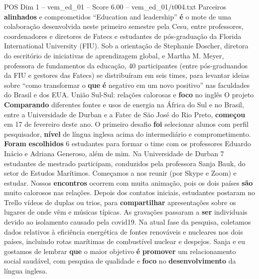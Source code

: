 \begin{textsample}{POS Dim 1 – vem\_ed\_01 – Score 6.00 – vem\_ed\_01/t004.txt}  \label{ex:f1_pos_095}
Parceiros \textbf{alinhados} e comprometidos “Education and leadership” \textbf{é} o mote de uma colaboração desenvolvida neste primeiro semestre pela Cesu, entre professores, coordenadores e diretores de Fatecs e estudantes de pós-graduação da Florida International University (FIU).
Sob a orientação de Stephanie Doscher, diretora do escritório de iniciativas de aprendizagem global, e Martha M.
Meyer, professora de fundamentos da educação, 40 participantes (entre pós-graduandos da FIU e gestores das Fatecs) se distribuíram em seis times, para levantar ideias sobre “como transformar o \textbf{que} \textbf{é} negativo em um novo positivo” nas faculdades do Brasil e dos EUA.
União Sul-Sul: relações calorosas e \textbf{foco} no inglês O projeto \textbf{Comparando} diferentes fontes e usos de energia na África do Sul e no Brasil, entre a Universidade de Durban e a Fatec de São José do Rio Preto, \textbf{começou} em 17 de fevereiro deste ano.
O primeiro desafio \textbf{foi} selecionar alunos com perfil pesquisador, \textbf{nível} de língua inglesa acima do intermediário e comprometimento. \textbf{Foram} \textbf{escolhidos} 6 estudantes para formar o time com os professores Eduardo Inácio e Adriana Generoso, além de mim.
Na Universidade de Durban 7 estudantes de mestrado participam, conduzidos pela professora Sanja Bauk, do setor de Estudos Marítimos.
Começamos a nos reunir (por Skype e Zoom) e estudar.
Nossos \textbf{encontros} ocorrem com muita animação, pois os dois países \textbf{são} muito calorosos nas relações.
Depois dos contatos iniciais, estudantes postaram no Trello vídeos de duplas ou trios, para \textbf{compartilhar} apresentações sobre os lugares de onde vêm e músicas típicas.
As gravações passaram a \textbf{ser} individuais devido ao isolamento causado pela covid19.
Na atual fase da pesquisa, coletamos dados relativos à eficiência energética de fontes renováveis e nucleares nos dois países, incluindo rotas marítimas de combustível nuclear e despejos.
Sanja e eu gostamos de lembrar \textbf{que} o maior objetivo \textbf{é} \textbf{promover} um relacionamento social saudável, com pesquisa de qualidade e \textbf{foco} no \textbf{desenvolvimento} da língua inglesa.

\end{textsample}
